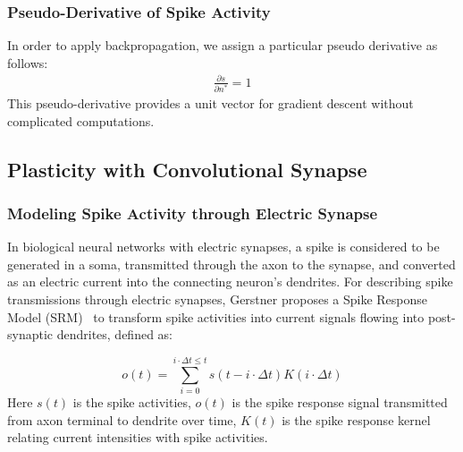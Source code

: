 \documentclass{article}
\begin{document}
\subsubsection{Pseudo-Derivative of Spike Activity}
In order to apply backpropagation, we assign a particular pseudo derivative as follows:
\begin{align}
\frac{\partial s}{\partial n^{*}} = 1
\end{align}This pseudo-derivative provides a unit vector for gradient descent without complicated computations.





\subsection{Plasticity with Convolutional Synapse}



\subsubsection{Modeling Spike Activity through Electric Synapse}
In biological neural networks with electric synapses, a spike is considered to be generated in a soma, transmitted through the axon to the synapse, and converted as an electric current into the connecting neuron's dendrites. For describing spike transmissions through electric synapses, Gerstner  proposes a Spike Response Model (SRM) \ to transform spike activities into current signals flowing into post-synaptic dendrites, defined as:


\begin{equation}
    o(t) = \sum\limits_{i=0}^{i\cdot \Delta t \leq t}s(t-i\cdot \Delta t)K(i\cdot \Delta t)
\end{equation}
Here $s(t)$ is the spike activities, $o(t)$ is the spike response signal transmitted from axon terminal to dendrite over time, $K(t)$ is the spike response kernel relating current intensities with spike activities.
\end{document}
